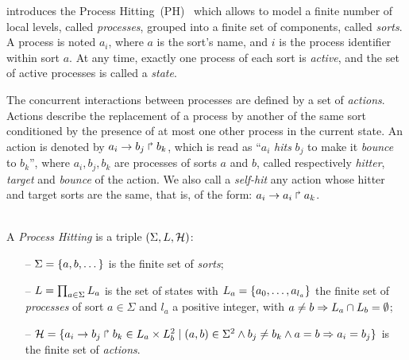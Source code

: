 

 introduces the Process Hitting~(PH)~\cite{pauleve2011modelisation}
which allows to model
a finite number of local levels,
called \emph{processes},
grouped into a finite set of components, called \emph{sorts}.
A process is noted $a_i$, where $a$ is the sort's name,
and $i$ is the process identifier within sort $a$.
At any time, exactly one process of each sort is \emph{active},
and the set of active processes is called a \emph{state}.

The concurrent interactions between processes are defined by a set of \emph{actions}.
Actions describe the replacement of a process by another of the same sort
conditioned by the presence of at most one other process in the current state.
An action is denoted by $a_i\rightarrow b_j\Rsh b_k$, which is read as
``$a_i$ \emph{hits} $b_j$ to make it \emph{bounce} to $b_k$'',
where $a_i,b_j,b_k$ are processes of sorts $a$ and $b$,
called respectively \emph{hitter}, \emph{target} and
\emph{bounce} of the action.
We also call a \emph{self-hit} any action whose hitter and target sorts are the same,
that is, of the form: $a_i\rightarrow a_i\Rsh a_k$.

\begin{definition}\label{def:PH} \\
  A \emph{Process Hitting} is a triple $(\Sigma,L,\mathcal{H})$:
  \begin{itemize}
    \item[--]  $\Sigma = \{a,b,\dots\}$ is the finite set of \emph{sorts};
    \item[--]  $L = \prod_{a\in\Sigma} L_a$ is the set of states with
      $L_a = \{a_0,\dots,a_{l_a}\}$
      the finite set of \emph{processes} of sort $a\in\Sigma$
      and $l_a$ a positive integer, with $a\neq b\Rightarrow L_a \cap L_b = \emptyset$;
    \item[--]  $\mathcal{H} = \{ a_i\rightarrow b_j\Rsh b_k \in L_a \times L_b^2 \mid
      (a,b) \in \Sigma^2 \wedge b_j\neq b_k \wedge a=b\Rightarrow a_i=b_j\}$
      is the finite set of \emph{actions}.
  \end{itemize}
\end{definition}


